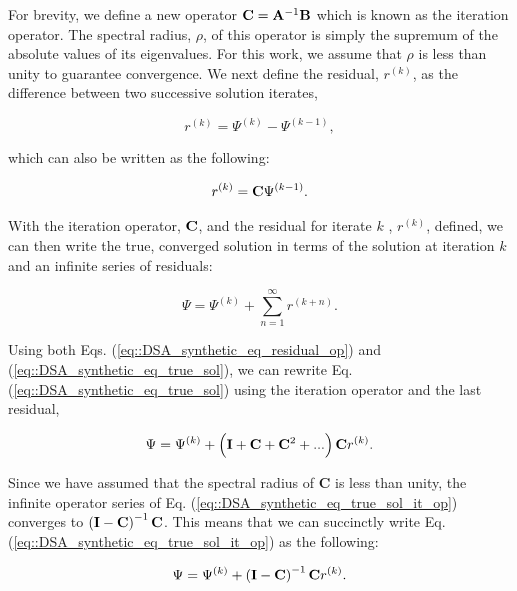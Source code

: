 \noindent For brevity, we define a new operator ${\bf C} = {\bf A}^{-1} {\bf B}$ which is known as the iteration operator. The spectral radius, $\rho$, of this operator is simply the supremum of the absolute values of its eigenvalues. For this work, we assume that $\rho$ is less than unity to guarantee convergence. We next define the residual, $r^{(k)}$, as the difference between two successive solution iterates,

\begin{equation}
\label{eq::DSA_synthetic_eq_residual}
r^{(k)} = \Psi^{(k)} - \Psi^{(k-1)} ,
\end{equation}

\noindent which can also be written as the following:

\begin{equation}
\label{eq::DSA_synthetic_eq_residual_op}
r^{(k)} = {\bf C}\Psi^{(k-1)} .
\end{equation}

With the iteration operator, ${\bf C}$, and the residual for iterate $k$ , $r^{(k)}$, defined, we can then write the true, converged solution in terms of the solution at iteration $k$ and an infinite series of residuals:

\begin{equation}
\label{eq::DSA_synthetic_eq_true_sol}
\Psi = \Psi^{(k)} + \sum_{n=1}^{\infty} r^{(k+n)} .
\end{equation}

\noindent Using both Eqs. (\ref{eq::DSA_synthetic_eq_residual_op}) and (\ref{eq::DSA_synthetic_eq_true_sol}), we can rewrite Eq. (\ref{eq::DSA_synthetic_eq_true_sol}) using the iteration operator and the last residual,

\begin{equation}
\label{eq::DSA_synthetic_eq_true_sol_it_op}
\Psi = \Psi^{(k)} + \left(  {\bf I} + {\bf C} + {\bf C}^2 + ...  \right) {\bf C} r^{(k)}.
\end{equation}

\noindent Since we have assumed that the spectral radius of {\bf C} is less than unity, the infinite operator series of Eq. (\ref{eq::DSA_synthetic_eq_true_sol_it_op}) converges to $\left(  {\bf I} - {\bf C}   \right)^{-1} {\bf C}$. This means that we can succinctly write Eq. (\ref{eq::DSA_synthetic_eq_true_sol_it_op}) as the following:

\begin{equation}
\label{eq::DSA_synthetic_eq_true_sol_it_op_succinct}
\Psi = \Psi^{(k)} + \left(  {\bf I} - {\bf C}   \right)^{-1} {\bf C} r^{(k)}.
\end{equation}

